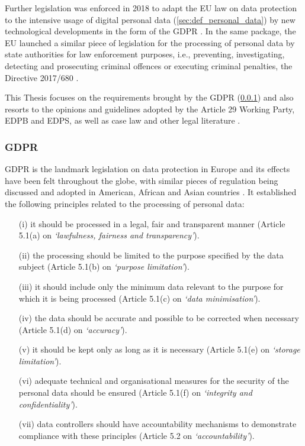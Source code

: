 Further legislation was enforced in 2018 to adapt the EU law on data protection to the intensive usage of digital personal data (\ref{sec:def_personal_data}) by new technological developments in the form of the GDPR \citeyearpar{noauthor_regulation_2016}.
In the same package, the EU launched a similar piece of legislation for the processing of personal data by state authorities for law enforcement purposes, i.e., preventing, investigating, detecting and prosecuting criminal offences or executing criminal penalties, the Directive 2017/680 \citeyearpar{noauthor_directive_2016}.

This Thesis focuses on the requirements brought by the GDPR (\ref{sec:def_gdpr}) and also resorts to the opinions and guidelines adopted by the Article 29 Working Party, EDPB and EDPS, as well as case law and other legal literature \citep{european_union_agency_for_fundamental_rights_and_council_of_europe_handbook_2018}.

\subsubsection{GDPR}
\label{sec:def_gdpr}

GDPR \citeyearpar{noauthor_regulation_2016} is the landmark legislation on data protection in Europe and its effects have been felt throughout the globe, with similar pieces of regulation being discussed and adopted in American, African and Asian countries \citep{bradford_brussels_2019}. It established the following principles related to the processing of personal data:
\begin{enumerate}
    \item [(i)] it should be processed in a legal, fair and transparent manner (Article 5.1(a) on \textit{`lawfulness, fairness and transparency'}).
    \item [(ii)] the processing should be limited to the purpose specified by the data subject (Article 5.1(b) on \textit{`purpose limitation'}).
    \item [(iii)] it should include only the minimum data relevant to the purpose for which it is being processed (Article 5.1(c) on \textit{`data minimisation'}).
    \item [(iv)] the data should be accurate and possible to be corrected when necessary (Article 5.1(d) on \textit{`accuracy'}).
    \item [(v)] it should be kept only as long as it is necessary (Article 5.1(e) on \textit{`storage limitation'}).
    \item [(vi)] adequate technical and organisational measures for the security of the personal data should be ensured (Article 5.1(f) on \textit{`integrity and confidentiality'}).
    \item [(vii)] data controllers should have accountability mechanisms to demonstrate compliance with these principles (Article 5.2 on \textit{`accountability'}).
\end{enumerate}

